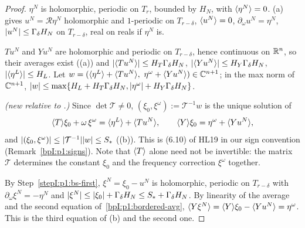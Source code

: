 \begin{proof}
\label{stepI:p1:bs-first}
$\eta^N$ is holomorphic, periodic on $T_r$, bounded by $H_N$, with $\langle \eta^N\rangle=0$. (a) gives $u^N=\mathcal R\eta^N$ holomorphic
and $1$-periodic on $T_{r-\delta}$, $\langle u^N\rangle=0$, $\partial_\omega u^N=\eta^N$, $\lvert u^N\rvert\le\Gamma_\delta H_N$ on $T_{r-\delta}$, real on reals if $\eta^N$ is.

\label{stepI:p1:bs-averages}
$Tu^N$ and $Yu^N$ are holomorphic and periodic on $T_{r-\delta}$, hence continuous on $\mathbb{R}^n$, so their averages exist
((a)) and $\lvert \langle Tu^N\rangle\rvert\le H_T\Gamma_\delta H_N$, $\lvert \langle Yu^N\rangle\rvert\le H_Y\Gamma_\delta H_N$,
$\lvert \langle \eta^L\rangle\rvert\le H_L$. Let $w=(\avg{\eta^L}+\avg{Tu^N},\ \eta^\omega+\avg{Yu^N})\in\C^{n+1}$; in the max norm of $\mathbb{C}^{n+1}$,
$\lvert w\rvert\le\max\{H_L+H_T\Gamma_\delta H_N,\lvert \eta^\omega\rvert+H_Y\Gamma_\delta H_N\}$.

\label{stepI:p1:bs-bordered}
\emph{(new relative to .)} Since $\det\mathcal T\ne0$, $(\xi_0,\xi^\omega):=\mathcal T^{-1}w$ is the unique solution of
\begin{equation}\label{bpI:p1:bordered-avg}
\langle T\rangle\xi_0+\omega\,\xi^\omega=\langle \eta^L\rangle+\langle Tu^N\rangle,\qquad\langle Y\rangle\xi_0=\eta^\omega+\langle Yu^N\rangle,
\end{equation}
and $\lvert (\xi_0,\xi^\omega)\rvert\le\lvert \mathcal T^{-1}\rvert\lvert w\rvert\le S_*$ ((b)). This is (6.10) of HL19 in our sign convention
(Remark~\ref{bpI:p1:signs}). Note that $\langle T\rangle$ alone need not be invertible: the matrix $\mathcal T$ determines the constant $\xi_0$ and the
frequency correction $\xi^\omega$ together.

\label{stepI:p1:bs-energy}
By Step~\ref{stepI:p1:bs-first}, $\xi^N=\xi_0-u^N$ is holomorphic, periodic on $T_{r-\delta}$ with $\partial_\omega\xi^N=-\eta^N$ and
$\lvert \xi^N\rvert\le\lvert \xi_0\rvert+\Gamma_\delta H_N\le S_*+\Gamma_\delta H_N$. By linearity of the average and the second equation of~\eqref{bpI:p1:bordered-avg},
$\langle Y\xi^N\rangle=\langle Y\rangle\xi_0-\langle Yu^N\rangle=\eta^\omega$. This is the third equation of (b) and the second one.


\end{proof}
